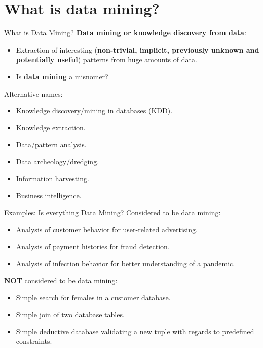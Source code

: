 \section{What is data mining?}

\begin{frame}{What is Data Mining?}
	\textbf{Data mining or knowledge discovery from data}:
	\begin{itemize}
		\item Extraction of interesting (\textbf{non-trivial, implicit,
			      previously unknown and potentially useful}) patterns from huge amounts
		      of data.
		\item Is \textbf{data mining} a misnomer?
	\end{itemize}
	Alternative names:
	\begin{itemize}
		\item Knowledge discovery/mining in databases (KDD).
		\item Knowledge extraction.
		\item Data/pattern analysis.
		\item Data archeology/dredging.
		\item Information harvesting.
		\item Business intelligence.
	\end{itemize}
\end{frame}

\begin{frame}{Examples: Is everything Data Mining?}
	Considered to be data mining:
	\begin{itemize}
		\item Analysis of customer behavior for user-related advertising.
		\item Analysis of payment histories for fraud detection.
		\item Analysis of infection behavior for better understanding of a
		      pandemic.
	\end{itemize}
	\textbf{NOT} considered to be data mining:
	\begin{itemize}
		\item Simple search for females in a customer database.
		\item Simple join of two database tables.
		\item Simple deductive database validating a new tuple with regards to
		      predefined constraints.
	\end{itemize}
\end{frame}

